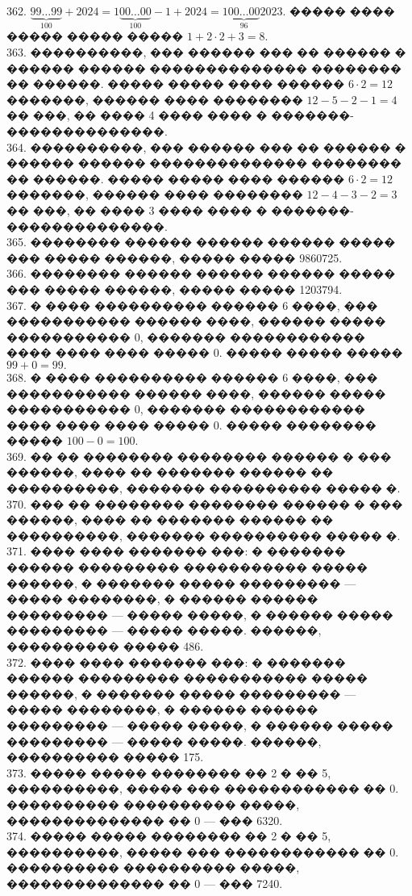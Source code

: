 \documentclass[12pt]{article}
\begin{document}
362. $\underbrace{99\ldots99}_{100}+2024=1\underbrace{00\ldots00}_{100}-1+2024=1\underbrace{00\ldots00}_{96}2023.$ ����� ���� ����� ����� ����� $1+2\cdot2+3=8.$\\
363. ����������, ��� ������ ��� �� ������ � ������ ������ �������������� �������� �� ������. ����� ����� ���� ������ $6\cdot2=12$ �������, ������ ���� �������� $12-5-2-1=4$ �� ���, �� ���� 4 ���� ���� � �������-��������������.\\
364. ����������, ��� ������ ��� �� ������ � ������ ������ �������������� �������� �� ������. ����� ����� ���� ������ $6\cdot2=12$ �������, ������ ���� �������� $12-4-3-2=3$ �� ���, �� ���� 3 ���� ���� � �������-��������������.\\
365. �������� ������ ������ ������ ����� ��� ����� ������, ����� ����� 9860725.\\
366. �������� ������ ������ ������ ����� ��� ����� ������, ����� ����� 1203794.\\
367. � ���� ���������� ������ 6 ����, ��� ����������� ������ ����, ������ ����� ����������� 0, ������� ������������ ���� ���� ���� ����� 0. ����� ����� ����� $99+0=99.$\\
368. � ���� ���������� ������ 6 ����, ��� ����������� ������ ����, ������ ����� ����������� 0, ������� ������������ ���� ���� ���� ����� 0. ����� �������� ����� $100-0=100.$\\
369. �� �� �������� �������� ������ � ��� ������, ���� �� ������� ������ �� ����������, ������� ���������� ����� �.\\
370. ��� �� �������� �������� ������ � ��� ������, ���� �� ������� ������ �� ����������, ������� ���������� ����� �.\\
371. ���� ���� ������� ���: � ������� ������ ��������� ����������� ����� ������, � ������� ����� ��������� --- ����� ��������,
� ������ ������ ��������� --- ����� �����, � ������ ����� ��������� --- ����� �����. ������, ���������� ����� 486.\\
372. ���� ���� ������� ���: � ������� ������ ��������� ����������� ����� ������, � ������� ����� ��������� --- ����� ��������,
� ������ ������ ��������� --- ����� �����, � ������ ����� ��������� --- ����� �����. ������, ���������� ����� 175.\\
373. ����� ����� �������� �� 2 � �� 5, ����������, ����� ��� ������������ �� 0. ���������� ���������� �����, �������������� �� 0 --- ��� 6320.\\
374. ����� ����� �������� �� 2 � �� 5, ����������, ����� ��� ������������ �� 0. ���������� ���������� �����, �������������� �� 0 --- ��� 7240.\\
\end{document}

